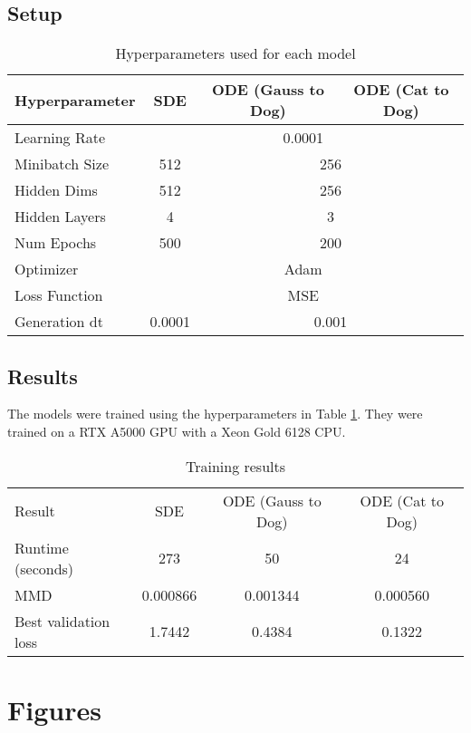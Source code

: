 \documentclass[conference,a4paper]{IEEEtran}
\begin{document}
\subsection{Setup}
\begin{table}
    \caption{Hyperparameters used for each model}
    \label{tab:hyp}
    \centering
    \begin{tabular}{lccc}
        \toprule
        Hyperparameter & SDE & ODE (Gauss to Dog) & ODE (Cat to Dog) \\
        \midrule
        Learning Rate & \multicolumn{3}{c}{0.0001} \\
        Minibatch Size & 512 & \multicolumn{2}{c}{256} \\
        Hidden Dims & 512 & \multicolumn{2}{c}{256}\\
        Hidden Layers & 4 & \multicolumn{2}{c}{3} \\
        Num Epochs & 500 & \multicolumn{2}{c}{200}\\
        Optimizer & \multicolumn{3}{c}{Adam} \\
        Loss Function & \multicolumn{3}{c}{MSE} \\
        Generation dt & 0.0001 & \multicolumn{2}{c}{0.001} \\
        \midrule
        \bottomrule
    \end{tabular}
\end{table}

\subsection{Results}
The models were trained using the hyperparameters in Table \ref{tab:hyp}. They were trained on a RTX A5000 GPU with a Xeon Gold 6128 CPU. 
\begin{table}
    \caption{Training results}
    \label{tab:mmd}
    \centering
    \begin{tabular}{lccc}
        \toprule
        Result & SDE & ODE (Gauss to Dog) & ODE (Cat to Dog) \\
        Runtime (seconds) & 273 & 50 & 24 \\
        MMD & 0.000866 & 0.001344 & 0.000560 \\
        Best validation loss & 1.7442 & 0.4384 & 0.1322 \\
        \midrule
        \bottomrule
    \end{tabular}
\end{table}

\section{Figures}
\end{document}
